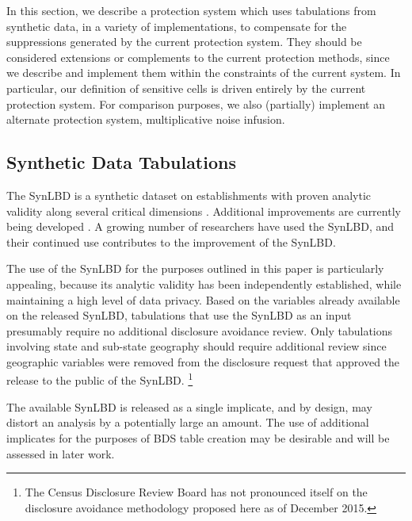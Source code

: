
In this section, we describe a protection system which uses tabulations from synthetic data, in a variety of implementations, to compensate for the suppressions generated by the current protection system. They should be considered extensions or complements to the current protection methods, since we describe and implement them within the constraints of the current system. In particular, our definition of sensitive cells is driven entirely by the current protection system. For comparison purposes, we also (partially) implement an  alternate protection system, multiplicative noise infusion. 

\subsection{Synthetic Data Tabulations}


The \ac{SynLBD} \cite{SynLBD20} is a synthetic dataset on establishments with proven analytic 
validity along several critical dimensions \cite{KinneyEtAl2011}. Additional improvements are 
currently being developed \cite{KinneyEtAl2013,CES-WP-2014-12}. A growing number of 
researchers have used the \ac{SynLBD}, and their continued use contributes to the 
improvement of the \ac{SynLBD}. 

The use of the \ac{SynLBD} for the purposes outlined in this paper is particularly appealing, 
because its analytic validity has been independently established, while maintaining a high level 
of data privacy. Based on the variables already available on the released \ac{SynLBD}, tabulations that 
use the \ac{SynLBD} as an input presumably require no additional disclosure avoidance review. %
Only tabulations involving state and sub-state geography should require 
additional review since geographic variables were removed from the disclosure request that 
approved the  release to the public of the SynLBD.%
\footnote{The Census Disclosure Review Board has not pronounced itself on the disclosure 
avoidance methodology proposed here as of December 2015.}
 
The available \ac{SynLBD} is released as a single implicate, and by design, may distort an analysis by a potentially large an amount. The use of additional implicates for the purposes of BDS table creation may be desirable and will be assessed in later work. 

